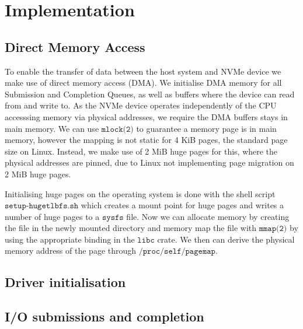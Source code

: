 \chapter{Implementation}
\section{Direct Memory Access}
To enable the transfer of data between the host system and NVMe device we make use of direct memory access (DMA). We initialise DMA memory for all Submission and Completion Queues, as well as buffers where the device can read from and write to. As the NVMe device operates independently of the CPU accesssing memory via physical addresses, we require the DMA buffers stays in main memory. We can use $\texttt{mlock(2)}$ to guarantee a memory page is in main memory, however the mapping is not static for 4 KiB pages, the standard page size on Linux. Instead, we make use of 2 MiB huge pages for this, where the physical addresses are pinned, due to Linux not implementing page migration on 2 MiB huge pages\cite{user_space_net}.

Initialising huge pages on the operating system is done with the shell script $\texttt{setup-hugetlbfs.sh}$ which creates a mount point for huge pages and writes a number of huge pages to a $\texttt{sysfs}$ file. Now we can allocate memory by creating the file in the newly mounted directory and memory map the file with $\texttt{mmap(2)}$ by using the appropriate binding in the $\texttt{libc}$ crate. We then can derive the physical memory address of the page through $\texttt{/proc/self/pagemap}$.

\section{Driver initialisation}
\section{I/O submissions and completion}
